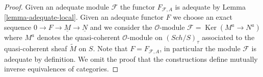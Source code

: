 \documentclass{stacks-project}
\theoremstyle{plain}
\theoremstyle{definition}
\theoremstyle{remark}
\numberwithin{equation}{subsection}
\def\Sch{\mathit{Sch}}
\def\Ker{\mathop{\mathrm{Ker}}}
\begin{document}
\begin{proof}
Given an adequate module $\mathcal{F}$ the functor $F_{\mathcal{F}, A}$
is adequate by Lemma \ref{lemma-adequate-local}.
Given an adequate functor $F$ we choose an exact sequence
$0 \to F \to \underline{M} \to \underline{N}$ and we consider
the $\mathcal{O}$-module $\mathcal{F} = \Ker(M^a \to N^a)$ where
$M^a$ denotes the quasi-coherent $\mathcal{O}$-module on
$(\Sch/S)_\tau$ associated to the quasi-coherent sheaf
$\widetilde{M}$ on $S$. Note that $F = F_{\mathcal{F}, A}$, in particular
the module $\mathcal{F}$ is adequate by definition.
We omit the proof that the constructions define mutually inverse
equivalences of categories.
\end{proof}
\end{document}
